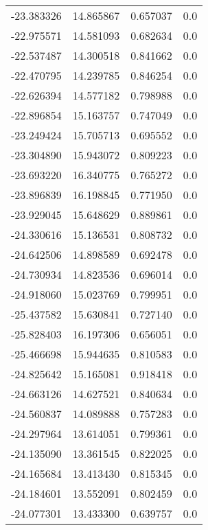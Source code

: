 \begin{tabular}{rrrr}
      -23.383326 &        14.865867 &    0.657037 &   0.0 \\
      -22.975571 &        14.581093 &    0.682634 &   0.0 \\
      -22.537487 &        14.300518 &    0.841662 &   0.0 \\
      -22.470795 &        14.239785 &    0.846254 &   0.0 \\
      -22.626394 &        14.577182 &    0.798988 &   0.0 \\
      -22.896854 &        15.163757 &    0.747049 &   0.0 \\
      -23.249424 &        15.705713 &    0.695552 &   0.0 \\
      -23.304890 &        15.943072 &    0.809223 &   0.0 \\
      -23.693220 &        16.340775 &    0.765272 &   0.0 \\
      -23.896839 &        16.198845 &    0.771950 &   0.0 \\
      -23.929045 &        15.648629 &    0.889861 &   0.0 \\
      -24.330616 &        15.136531 &    0.808732 &   0.0 \\
      -24.642506 &        14.898589 &    0.692478 &   0.0 \\
      -24.730934 &        14.823536 &    0.696014 &   0.0 \\
      -24.918060 &        15.023769 &    0.799951 &   0.0 \\
      -25.437582 &        15.630841 &    0.727140 &   0.0 \\
      -25.828403 &        16.197306 &    0.656051 &   0.0 \\
      -25.466698 &        15.944635 &    0.810583 &   0.0 \\
      -24.825642 &        15.165081 &    0.918418 &   0.0 \\
      -24.663126 &        14.627521 &    0.840634 &   0.0 \\
      -24.560837 &        14.089888 &    0.757283 &   0.0 \\
      -24.297964 &        13.614051 &    0.799361 &   0.0 \\
      -24.135090 &        13.361545 &    0.822025 &   0.0 \\
      -24.165684 &        13.413430 &    0.815345 &   0.0 \\
      -24.184601 &        13.552091 &    0.802459 &   0.0 \\
      -24.077301 &        13.433300 &    0.639757 &   0.0 \\

\end{tabular}

